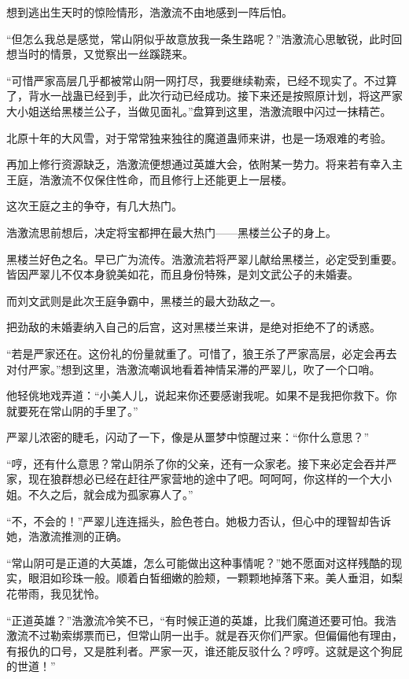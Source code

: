 \begin{this_body}
想到逃出生天时的惊险情形，浩激流不由地感到一阵后怕。

“但怎么我总是感觉，常山阴似乎故意放我一条生路呢？”浩激流心思敏锐，此时回想当时的情景，又觉察出一丝蹊跷来。

“可惜严家高层几乎都被常山阴一网打尽，我要继续勒索，已经不现实了。不过算了，背水一战蛊已经到手，此次行动已经成功。接下来还是按照原计划，将这严家大小姐送给黑楼兰公子，当做见面礼。”盘算到这里，浩激流眼中闪过一抹精芒。

北原十年的大风雪，对于常常独来独往的魔道蛊师来讲，也是一场艰难的考验。

再加上修行资源缺乏，浩激流便想通过英雄大会，依附某一势力。将来若有幸入主王庭，浩激流不仅保住性命，而且修行上还能更上一层楼。

这次王庭之主的争夺，有几大热门。

浩激流思前想后，决定将宝都押在最大热门——黑楼兰公子的身上。

黑楼兰好色之名。早已广为流传。浩激流若将严翠儿献给黑楼兰，必定受到重要。皆因严翠儿不仅本身貌美如花，而且身份特殊，是刘文武公子的未婚妻。

而刘文武则是此次王庭争霸中，黑楼兰的最大劲敌之一。

把劲敌的未婚妻纳入自己的后宫，这对黑楼兰来讲，是绝对拒绝不了的诱惑。

“若是严家还在。这份礼的份量就重了。可惜了，狼王杀了严家高层，必定会再去对付严家。”想到这里，浩激流嘲讽地看着神情呆滞的严翠儿，吹了一个口哨。

他轻佻地戏弄道：“小美人儿，说起来你还要感谢我呢。如果不是我把你救下。你就要死在常山阴的手里了。”

严翠儿浓密的睫毛，闪动了一下，像是从噩梦中惊醒过来：“你什么意思？”

“哼，还有什么意思？常山阴杀了你的父亲，还有一众家老。接下来必定会吞并严家，现在狼群想必已经在赶往严家营地的途中了吧。呵呵呵，你这样的一个大小姐。不久之后，就会成为孤家寡人了。”

“不，不会的！”严翠儿连连摇头，脸色苍白。她极力否认，但心中的理智却告诉她，浩激流推测的正确。

“常山阴可是正道的大英雄，怎么可能做出这种事情呢？”她不愿面对这样残酷的现实，眼泪如珍珠一般。顺着白皙细嫩的脸颊，一颗颗地掉落下来。美人垂泪，如梨花带雨，我见犹怜。

“正道英雄？”浩激流冷笑不已，“有时候正道的英雄，比我们魔道还要可怕。我浩激流不过勒索绑票而已，但常山阴一出手。就是吞灭你们严家。但偏偏他有理由，有报仇的口号，又是胜利者。严家一灭，谁还能反驳什么？哼哼。这就是这个狗屁的世道！”


\end{this_body}
